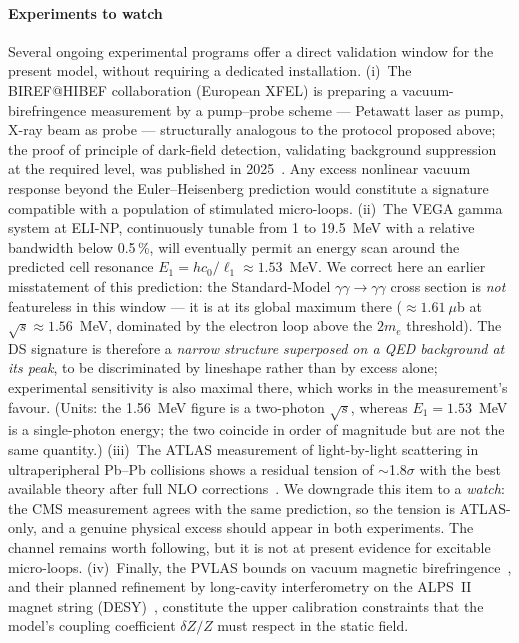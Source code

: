 \documentclass[11pt,a4paper]{article}
\theoremstyle{plain}
\theoremstyle{remark}
\begin{document}
\paragraph{Experiments to watch}
Several ongoing experimental programs offer a direct validation window for the present model, without requiring a dedicated installation. (i)~The BIREF@HIBEF collaboration (European XFEL) is preparing a vacuum-birefringence measurement by a pump--probe scheme --- Petawatt laser as pump, X-ray beam as probe --- structurally analogous to the protocol proposed above; the proof of principle of dark-field detection, validating background suppression at the required level, was published in 2025~\cite{BIREF2025, Smid2025}. Any excess nonlinear vacuum response beyond the Euler--Heisenberg prediction would constitute a signature compatible with a population of stimulated micro-loops. (ii)~The VEGA gamma system at ELI-NP, continuously tunable from 1 to 19.5~MeV with a relative bandwidth below 0.5\,\%, will eventually permit an energy scan around the predicted cell resonance $E_1 = h c_0/\ell_1 \approx 1.53$~MeV. We correct here an earlier misstatement of this prediction: the Standard-Model $\gamma\gamma \to \gamma\gamma$ cross section is \emph{not} featureless in this window --- it is at its global maximum there ($\approx 1.61~\mu$b at $\sqrt{s} \approx 1.56$~MeV, dominated by the electron loop above the $2m_e$ threshold). The DS signature is therefore a \emph{narrow structure superposed on a QED background at its peak}, to be discriminated by lineshape rather than by excess alone; experimental sensitivity is also maximal there, which works in the measurement's favour. (Units: the 1.56~MeV figure is a two-photon $\sqrt{s}$, whereas $E_1 = 1.53$~MeV is a single-photon energy; the two coincide in order of magnitude but are not the same quantity.) (iii)~The ATLAS measurement of light-by-light scattering in ultraperipheral Pb--Pb collisions shows a residual tension of $\sim$1.8$\sigma$ with the best available theory after full NLO corrections~\cite{LbLNLO}. We downgrade this item to a \emph{watch}: the CMS measurement agrees with the same prediction, so the tension is ATLAS-only, and a genuine physical excess should appear in both experiments. The channel remains worth following, but it is not at present evidence for excitable micro-loops. (iv)~Finally, the PVLAS bounds on vacuum magnetic birefringence~\cite{PVLAS2020}, and their planned refinement by long-cavity interferometry on the ALPS~II magnet string (DESY)~\cite{ALPSII_VMB}, constitute the upper calibration constraints that the model's coupling coefficient $\delta Z/Z$ must respect in the static field.
\end{document}
